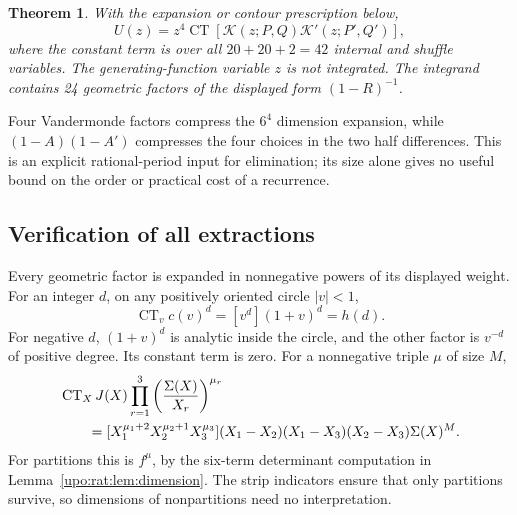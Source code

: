 \documentclass[11pt,letterpaper]{article}
\newtheorem{theorem}{Theorem}[section]
\theoremstyle{remark}\newtheorem{remark}[theorem]{Remark}
\numberwithin{equation}{section}
\newcommand{\CT}{\operatorname{CT}}
\begin{document}
\begin{theorem}\label{upo:rat:thm:CT}
With the expansion or contour prescription below,
\begin{equation}\label{upo:rat:eq:CT}
U(z)=z^4\CT\left[\mathcal K(z;P,Q)\mathcal K'(z;P',Q')\right],
\end{equation}
where the constant term is over all $20+20+2=42$ internal and shuffle
variables. The generating-function variable $z$ is not integrated.
The integrand contains 24 geometric factors of the displayed form
$(1-R)^{-1}$.
\end{theorem}
Four Vandermonde factors compress the $6^4$ dimension expansion, while
$(1-A)(1-A')$ compresses the four choices in the two half differences.
This is an explicit rational-period input for elimination; its size
alone gives no useful bound on the order or practical cost of a recurrence.

\subsection{Verification of all extractions}
Every geometric factor is expanded in nonnegative powers of its displayed
weight. For an integer $d$, on any positively oriented circle $|v|<1$,
\begin{equation}\label{upo:rat:eq:CTindicator}
\CT_v c(v)^d=[v^d](1+v)^d=h(d).
\end{equation}
For negative $d$, $(1+v)^d$ is analytic inside the circle, and the other
factor is $v^{-d}$ of positive degree. Its constant term is zero.
For a nonnegative triple $\mu$ of size $M$,
\begin{align}\label{upo:rat:eq:CTdim}
&\CT_X J(X)\prod_{r=1}^3\left(\frac{\Sigma(X)}{X_r}\right)^{\mu_r}
\notag\\
&\qquad=[X_1^{\mu_1+2}X_2^{\mu_2+1}X_3^{\mu_3}]
(X_1-X_2)(X_1-X_3)(X_2-X_3)\Sigma(X)^M.
\end{align}
For partitions this is $f^\mu$, by the six-term determinant computation
in Lemma~\ref{upo:rat:lem:dimension}. The strip indicators ensure that only
partitions survive, so dimensions of nonpartitions need no interpretation.
\end{document}
